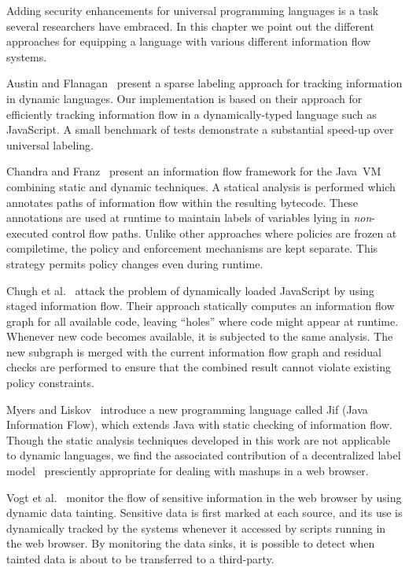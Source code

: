 Adding security enhancements for universal programming languages is a task several researchers have embraced.
In this chapter we point out the different approaches for equipping a language with various different information flow systems.

Austin and Flanagan~\cite{1554353,1814220} present a sparse labeling approach for tracking information in dynamic languages.
Our implementation is based on their approach for efficiently tracking information flow in a dynamically-typed language such as JavaScript.
A small benchmark of tests demonstrate a substantial speed-up over universal labeling.

Chandra and Franz~\cite{10.1109/ACSAC.2007.37} present an information flow framework for the Java~VM combining static and dynamic techniques.
A statical analysis is performed which annotates paths of information flow within the resulting bytecode.
These annotations are used at runtime to maintain labels of variables lying in \emph{non}-executed control flow paths.
Unlike other approaches where policies are frozen at compiletime, the policy and enforcement mechanisms are kept separate.
This strategy permits policy changes even during runtime.

Chugh et al.~\cite{1542483} attack the problem of dynamically loaded JavaScript by using staged information flow.
Their approach statically computes an information flow graph for all available code, leaving ``holes'' where code might appear at runtime.
Whenever new code becomes available, it is subjected to the same analysis.
The new subgraph is merged with the current information flow graph and residual checks are performed to ensure that the combined result cannot violate existing policy constraints.

Myers and Liskov~\cite{363526} introduce a new programming language called Jif (Java Information Flow), which extends Java with static checking of information flow.
Though the static analysis techniques developed in this work are not applicable to dynamic languages, we find the associated contribution of a decentralized label model~\cite{363526} presciently appropriate for dealing with mashups in a web browser.

Vogt et al.~\cite{Vogt_CrossSiteScripting_2007} monitor the flow of sensitive information in the web browser by using dynamic data tainting.
Sensitive data is first marked at each source, and its use is dynamically tracked by the systems whenever it accessed by scripts running in the web browser.
By monitoring the data sinks, it is possible to detect when tainted data is about to be transferred to a third-party.

